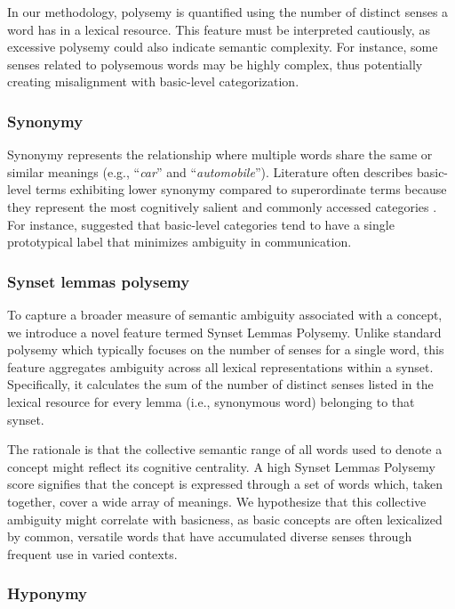 \documentclass[preprint,12pt,authoryear]{elsarticle}
\begin{document}
In our methodology, polysemy is quantified using the number of distinct senses a word has in a lexical resource. This feature must be interpreted cautiously, as excessive polysemy could also indicate semantic complexity. For instance, some senses related to polysemous words may be highly complex, thus potentially creating misalignment with basic-level categorization.

\subsubsection{Synonymy}
Synonymy represents the relationship where multiple words share the same or similar meanings (e.g., ``\textit{car}'' and ``\textit{automobile}''). Literature often describes basic-level terms exhibiting lower synonymy compared to superordinate terms because they represent the most cognitively salient and commonly accessed categories \cite{rosch_principles_1978,markman_childrens_1988,langacker_women_1988}. For instance, \citet{rosch_basic_1976} suggested that basic-level categories tend to have a single prototypical label that minimizes ambiguity in communication.

\subsubsection{Synset lemmas polysemy}
To capture a broader measure of semantic ambiguity associated with a concept, we introduce a novel feature termed Synset Lemmas Polysemy. Unlike standard polysemy which typically focuses on the number of senses for a single word, this feature aggregates ambiguity across all lexical representations within a synset. Specifically, it calculates the sum of the number of distinct senses listed in the lexical resource for every lemma (i.e., synonymous word) belonging to that synset.

The rationale is that the collective semantic range of all words used to denote a concept might reflect its cognitive centrality. A high Synset Lemmas Polysemy score signifies that the concept is expressed through a set of words which, taken together, cover a wide array of meanings. We hypothesize that this collective ambiguity might correlate with basicness, as basic concepts are often lexicalized by common, versatile words that have accumulated diverse senses through frequent use in varied contexts.

\subsubsection{Hyponymy}
\end{document}
